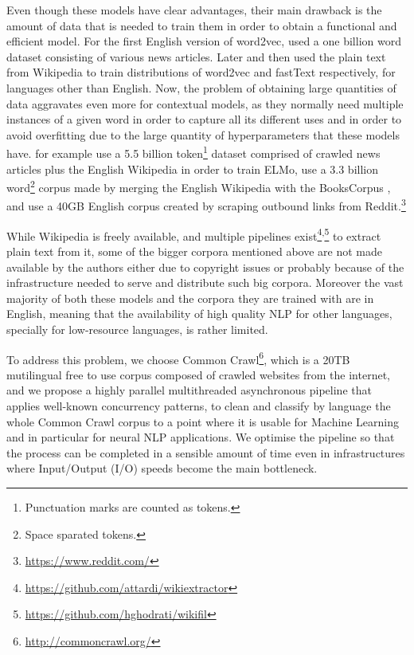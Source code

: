Even though these models have clear advantages, their main drawback is the amount of data that is needed to train them in order to obtain a functional and efficient model. For the first English version of word2vec, \citet{mikolov-etal-2013-distributed} used a one billion word dataset consisting of various news articles. Later \citet{Al-rfou:2013} and then \citet{Bojanowski:2017} used the plain text from Wikipedia to train distributions of word2vec and fastText respectively, for languages other than English. Now, the problem of obtaining large quantities of data aggravates even more for contextual models, as they normally need multiple instances of a given word in order to capture all its different uses and in order to avoid overfitting due to the large quantity of hyperparameters that these models have. \citet{Peters:2018} for example use a 5.5 billion token\footnote{Punctuation marks are counted as tokens.} dataset comprised of crawled news articles plus the English Wikipedia in order to train ELMo, \citet{Devlin:2018} use a 3.3 billion word\footnote{Space sparated tokens.} corpus made by merging the English Wikipedia with the BooksCorpus \citep{Zhu:2015}, and \citet{Radford:2019} use a 40GB English corpus created by scraping outbound links from Reddit.\footnote{\url{https://www.reddit.com/}}

While Wikipedia is freely available, and multiple pipelines exist\footnote{\url{https://github.com/attardi/wikiextractor}}\textsuperscript{,}\footnote{\url{https://github.com/hghodrati/wikifil}} to extract plain text from it, some of the bigger corpora mentioned above are not made available by the authors either due to copyright issues or probably because of the infrastructure needed to serve and distribute such big corpora. Moreover the vast majority of both these models and the corpora they are trained with are in English, meaning that the availability of high quality NLP for other languages, specially for low-resource languages, is rather limited.

To address this problem, we choose Common Crawl\footnote{\url{http://commoncrawl.org/}}, which is a 20TB mutilingual free to use corpus composed of crawled websites from the internet, and we propose a highly parallel multithreaded asynchronous pipeline that applies well-known concurrency patterns, to clean and classify by language the whole Common Crawl corpus to a point where it is usable for Machine Learning and in particular for neural NLP applications. We optimise the pipeline so that the process can be completed in a sensible amount of time even in infrastructures where Input/Output (I/O) speeds become the main bottleneck.

